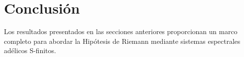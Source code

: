 \section{Conclusión}

Los resultados presentados en las secciones anteriores proporcionan un marco
completo para abordar la Hipótesis de Riemann mediante sistemas espectrales
adélicos S-finitos.